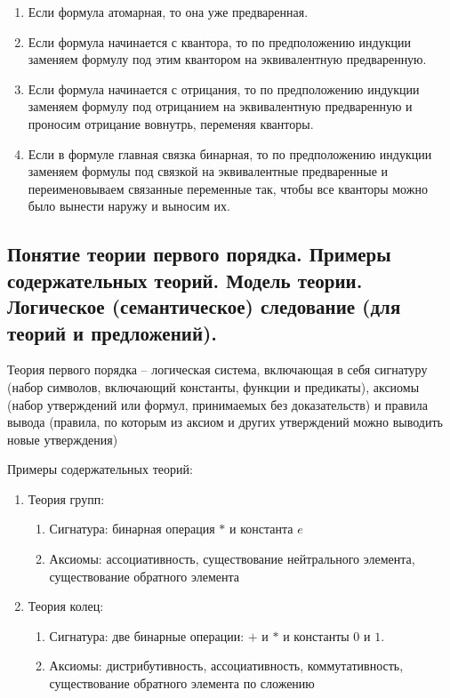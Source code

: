 \documentclass[a4paper, 10pt]{article}
\begin{document}
\begin{enumerate}
    \item Если формула атомарная, то она уже предваренная.
    \item Если формула начинается с квантора, то по предположению индукции заменяем формулу под этим квантором на эквивалентную предваренную.
    \item Если формула начинается с отрицания, то по предположению индукции заменяем формулу под отрицанием на эквивалентную предваренную и проносим отрицание вовнутрь, переменяя кванторы.
    \item Если в формуле главная связка бинарная, то по предположению индукции заменяем формулы под связкой на эквивалентные предваренные и переименовываем связанные переменные так, чтобы все кванторы можно было вынести наружу и выносим их.
\end{enumerate}

\subsection{Понятие теории первого порядка. Примеры содержательных теорий. Модель теории. Логическое (семантическое) следование (для теорий и предложений).}

Теория первого порядка -- логическая система, включающая в себя сигнатуру (набор символов, включающий константы, функции и предикаты), аксиомы (набор утверждений или формул, принимаемых без доказательств) и правила вывода (правила, по которым из аксиом и других утверждений можно выводить новые утверждения)

\hfill

Примеры содержательных теорий:

\begin{enumerate}
    \item Теория групп:
    \begin{enumerate}
        \item Сигнатура: бинарная операция $*$ и константа $e$
        \item Аксиомы: ассоциативность, существование нейтрального элемента, существование обратного элемента
    \end{enumerate}
    \item Теория колец:
    \begin{enumerate}
        \item Сигнатура: две бинарные операции: $+$ и $*$ и константы $0$ и $1$.
        \item Аксиомы: дистрибутивность, ассоциативность, коммутативность, существование обратного элемента по сложению
    \end{enumerate}
\end{enumerate}
\end{document}
